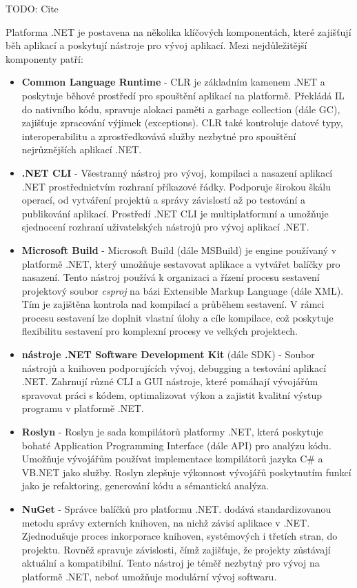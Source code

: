 TODO: Cite


Platforma .NET je postavena na několika klíčových komponentách, které zajišťují běh aplikací a poskytují nástroje pro vývoj aplikací. \cite{netdocs} Mezi nejdůležitější komponenty patří:

\begin{itemize}
    \item \textbf{Common Language Runtime} - CLR je základním kamenem .NET a poskytuje běhové prostředí pro spouštění aplikací na platformě. Překládá IL do nativního kódu, spravuje alokaci paměti a garbage collection (dále GC), zajišťuje zpracování výjimek (exceptions). CLR také kontroluje datové typy, interoperabilitu a zprostředkovává služby nezbytné pro spouštění nejrůznějších aplikací .NET.
    \item \textbf{.NET CLI} - Všestranný nástroj pro vývoj, kompilaci a nasazení aplikací .NET prostřednictvím rozhraní příkazové řádky. Podporuje širokou škálu operací, od vytváření projektů a správy závislostí až po testování a publikování aplikací. Prostředí .NET CLI je multiplatformní a umožňuje sjednocení rozhraní uživatelských nástrojů pro vývoj aplikací .NET.
    \item \textbf{Microsoft Build} - Microsoft Build (dále MSBuild) je engine používaný v platformě .NET, který umožňuje sestavovat aplikace a vytvářet balíčky pro nasazení. Tento nástroj používá k organizaci a řízení procesu sestavení projektový soubor \emph{csproj} na bázi Extensible Markup Language (dále XML). Tím je zajištěna kontrola nad kompilací a průběhem sestavení. V rámci procesu sestavení lze doplnit vlastní úlohy a cíle kompilace, což poskytuje flexibilitu sestavení pro komplexní procesy ve velkých projektech.
    \item \textbf{nástroje .NET Software Development Kit} (dále SDK) - Soubor nástrojů a knihoven podporujících vývoj, debugging a testování aplikací .NET. Zahrnují různé CLI a GUI nástroje, které pomáhají vývojářům spravovat práci s kódem, optimalizovat výkon a zajistit kvalitní výstup programu v platformě .NET.
    \item \textbf{Roslyn} - Roslyn je sada kompilátorů platformy .NET, která poskytuje bohaté Application Programming Interface (dále API) pro analýzu kódu. Umožňuje vývojářům používat implementace kompilátorů jazyka C\# a VB.NET jako služby. Roslyn zlepšuje výkonnost vývojářů poskytnutím funkcí jako je refaktoring, generování kódu a sémantická analýza.
    \item \textbf{NuGet} - Správce balíčků pro platformu .NET. dodává standardizovanou metodu správy externích knihoven, na nichž závisí aplikace v .NET. Zjednodušuje proces inkorporace knihoven, systémových i třetích stran, do projektu. Rovněž spravuje závislosti, čímž zajišťuje, že projekty zůstávají aktuální a kompatibilní. Tento nástroj je téměř nezbytný pro vývoj na platformě .NET, neboť umožňuje modulární vývoj softwaru.
\end{itemize}


